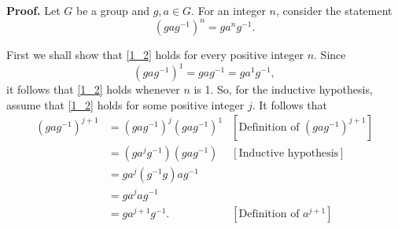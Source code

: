 \documentclass[9pt]{article}
\begin{document}
\begin{enumerate}
                  \textbf{Proof.} Let $G$ be a group and $g, a \in G$. For
                  an integer $n$, consider the statement
                  \begin{equation} \label{1_2}
                     (gag^{-1})^n = ga^ng^{-1}.
                  \end{equation}
                  
                  First we shall show that \eqref{1_2} holds for every positive
                  integer $n$. Since
                  $$(gag^{-1})^1 = gag^{-1} = ga^1g^{-1},$$
                  it follows that \eqref{1_2} holds whenever $n$ is 1. So, for
                  the inductive hypothesis, assume that \eqref{1_2} holds for
                  some positive integer $j$. It follows that
                  \begin{align*}
                     (gag^{-1})^{j+1} &= (gag^{-1})^j(gag^{-1})^1
                           &[\text{Definition of }(gag^{-1})^{j+1}] \\
                        &= (ga^jg^{-1})(gag^{-1})
                           &[\text{Inductive hypothesis}] \\
                        &= ga^j(g^{-1}g)ag^{-1} \\
                        &= ga^jag^{-1} \\
                        &= ga^{j+1}g^{-1}. &[\text{Definition of }a^{j+1}]
                  \end{align*}
                  

\end{enumerate}
\end{document}
